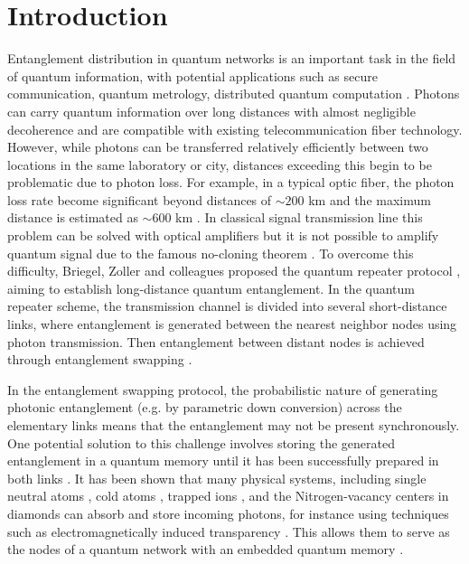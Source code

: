 \documentclass[%
  prx,%
  twocolumn,%
  preprintnumbers,%
  amsmath,%
  amssymb,%
  superscriptaddress%
]{revtex4}
\begin{document}
\maketitle


\section{Introduction}

Entanglement distribution in quantum networks is an important task in the field of quantum information, with potential applications such as secure communication, quantum metrology, distributed quantum computation \cite{Wei2022,Wehner2018,Azuma2023}. Photons can carry quantum information over long distances with almost negligible decoherence and are compatible with existing telecommunication fiber technology.  
However, while photons can be transferred relatively efficiently between two locations in the same laboratory or city, distances exceeding this begin to be problematic due to photon loss. 
For example, in a typical optic fiber, the photon loss rate become significant beyond distances of $ \sim 200 $ km and the maximum distance is estimated as $\sim 600$ km \cite{Pirandola2017, Yingqiu2021}. 
In classical signal transmission line this problem can be solved with optical amplifiers but it is not possible to amplify quantum signal due to the famous no-cloning theorem \cite{Park1970, Wootters1982, Nielsen2010}. To overcome this difficulty, Briegel, Zoller and colleagues proposed the quantum repeater protocol \cite{Briegel1998}, 
aiming to establish long-distance quantum entanglement. 
In the quantum repeater scheme, the transmission channel is divided into several short-distance links, where entanglement is generated between the nearest neighbor nodes using photon transmission.  Then entanglement between distant nodes is achieved through entanglement swapping \cite{bennett1993teleporting,zukowski1993event,Pan1998}. 

In the entanglement swapping protocol, the probabilistic nature of generating photonic entanglement (e.g. by parametric down conversion) across the elementary links means that the entanglement may not be present synchronously.  One potential solution to this challenge involves storing the generated entanglement in a quantum memory until it has been successfully prepared in both links \cite{Lvovsky2009, Simon2010, Heshami2016}. It has been shown that many physical systems, including single neutral atoms \cite{Reiserer2015,Rosenfeld2008}, 
cold atoms \cite{Sangouard2011}, 
trapped ions \cite{Duan2010}, 
and the Nitrogen-vacancy centers in diamonds \cite{Childress2006, Gurudev2007,hermans2022qubit}  
can absorb and store incoming photons, 
for instance using techniques such as electromagnetically induced transparency \cite{Fleischhauer2005}.  This allows them to serve as the nodes of a quantum network with an embedded quantum memory \cite{Duan2001,Duan2010,Ritter2012}. 
\end{document}
